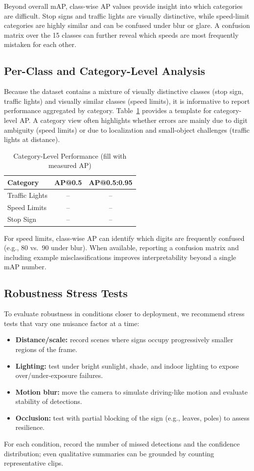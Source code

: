 \documentclass[conference]{IEEEtran}
\begin{document}
Beyond overall mAP, class-wise AP values provide insight into which categories are difficult. Stop signs and traffic lights are visually distinctive, while speed-limit categories are highly similar and can be confused under blur or glare. A confusion matrix over the 15 classes can further reveal which speeds are most frequently mistaken for each other.


\subsection{Per-Class and Category-Level Analysis}
Because the dataset contains a mixture of visually distinctive classes (stop sign, traffic lights) and visually similar classes (speed limits), it is informative to report performance aggregated by category. Table~\ref{tab:category} provides a template for category-level AP. A category view often highlights whether errors are mainly due to digit ambiguity (speed limits) or due to localization and small-object challenges (traffic lights at distance).

\begin{table}[H]
\centering
\caption{Category-Level Performance (fill with measured AP)}
\label{tab:category}
\begin{tabular}{lcc}
\toprule
\textbf{Category} & \textbf{AP@0.5} & \textbf{AP@0.5:0.95} \\
\midrule
Traffic Lights & -- & -- \\
Speed Limits & -- & -- \\
Stop Sign & -- & -- \\
\bottomrule
\end{tabular}
\end{table}

For speed limits, class-wise AP can identify which digits are frequently confused (e.g., 80 vs.\ 90 under blur). When available, reporting a confusion matrix and including example misclassifications improves interpretability beyond a single mAP number.

\subsection{Robustness Stress Tests}
To evaluate robustness in conditions closer to deployment, we recommend stress tests that vary one nuisance factor at a time:
\begin{itemize}
    \item \textbf{Distance/scale:} record scenes where signs occupy progressively smaller regions of the frame.
    \item \textbf{Lighting:} test under bright sunlight, shade, and indoor lighting to expose over/under-exposure failures.
    \item \textbf{Motion blur:} move the camera to simulate driving-like motion and evaluate stability of detections.
    \item \textbf{Occlusion:} test with partial blocking of the sign (e.g., leaves, poles) to assess resilience.
\end{itemize}
For each condition, record the number of missed detections and the confidence distribution; even qualitative summaries can be grounded by counting representative clips.
\end{document}
